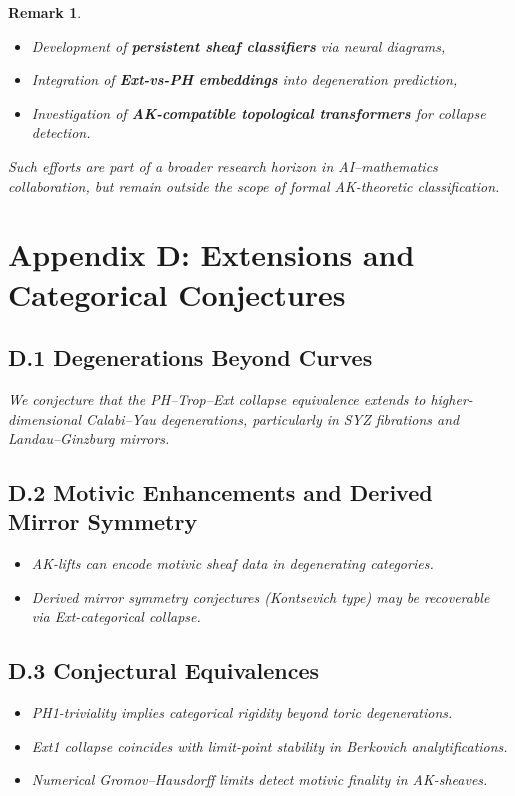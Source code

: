 \documentclass[11pt]{article}
\newtheorem{remark}[theorem]{Remark}
\begin{document}
\begin{remark}
\begin{itemize}
  \item Development of \textbf{persistent sheaf classifiers} via neural diagrams,
  \item Integration of \textbf{Ext-vs-PH embeddings} into degeneration prediction,
  \item Investigation of \textbf{AK-compatible topological transformers} for collapse detection.
\end{itemize}

Such efforts are part of a broader research horizon in AI–mathematics collaboration, but remain outside the scope of formal AK-theoretic classification.




\section*{Appendix D: Extensions and Categorical Conjectures}

\subsection*{D.1 Degenerations Beyond Curves}

We conjecture that the PH–Trop–Ext collapse equivalence extends to higher-dimensional Calabi–Yau degenerations, particularly in SYZ fibrations and Landau–Ginzburg mirrors.

\subsection*{D.2 Motivic Enhancements and Derived Mirror Symmetry}

\begin{itemize}
  \item AK-lifts can encode motivic sheaf data in degenerating categories.
  \item Derived mirror symmetry conjectures (Kontsevich type) may be recoverable via Ext-categorical collapse.
\end{itemize}

\subsection*{D.3 Conjectural Equivalences}

\begin{itemize}
  \item PH1-triviality implies categorical rigidity beyond toric degenerations.
  \item Ext1 collapse coincides with limit-point stability in Berkovich analytifications.
  \item Numerical Gromov–Hausdorff limits detect motivic finality in AK-sheaves.
\end{itemize}


\end{remark}
\end{document}
